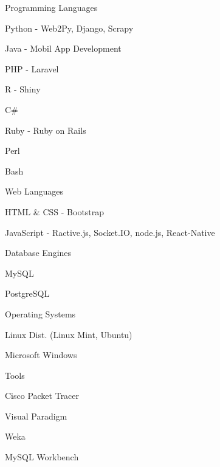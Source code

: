 \begin{cventries}
    \cventry
        {}
        {Programming Languages}
        {}
        {}
        {
            \begin{cvitems}
                \item {Python - Web2Py, Django, Scrapy}
                \item {Java - Mobil App Development}
                \item {PHP - Laravel}
                \item {R - Shiny}
                \item {C\#}
                \item {Ruby - Ruby on Rails}
                \item {Perl}
                \item {Bash}
            \end{cvitems}
        }
    \cventry
        {}
        {Web Languages}
        {}
        {}
        {
            \begin{cvitems}
                \item{HTML \& CSS - Bootstrap }
                \item{JavaScript - Ractive.js, Socket.IO, node.js, React-Native}
            \end{cvitems}
        }
    \cventry
        {}
        {Database Engines}
        {}
        {}
        {
            \begin{cvitems}
                \item{MySQL}
                \item{PostgreSQL}
            \end{cvitems}
        }
    \cventry
        {}
        {Operating Systems}
        {}
        {}
        {
            \begin{cvitems}
                \item{Linux Dist. (Linux Mint, Ubuntu)}
                \item{Microsoft Windows}
            \end{cvitems}
        }
    \cventry
        {}
        {Tools}
        {}
        {}
        {
            \begin{cvitems}
                \item{Cisco Packet Tracer}
                \item{Visual Paradigm}
                \item{Weka}
                \item{MySQL Workbench}

\end{cvitems}}
\end{cventries}
